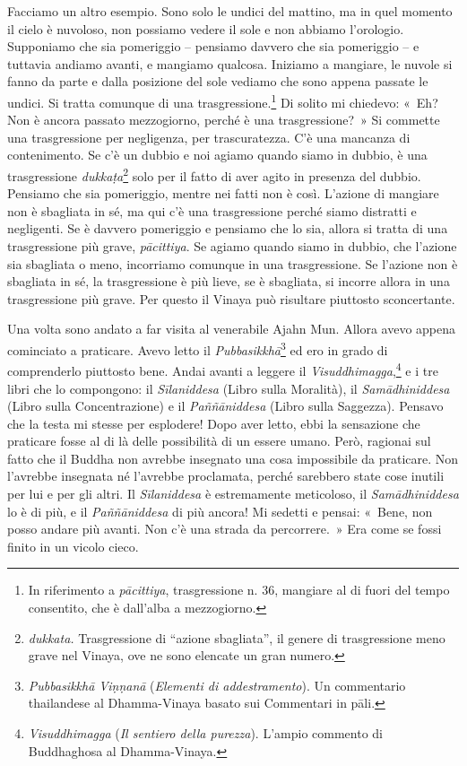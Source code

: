 Facciamo un altro esempio. Sono solo le undici del mattino, ma in quel
momento il cielo è nuvoloso, non possiamo vedere il sole e non abbiamo
l'orologio. Supponiamo che sia pomeriggio -- pensiamo davvero che sia
pomeriggio -- e tuttavia andiamo avanti, e mangiamo qualcosa. Iniziamo a
mangiare, le nuvole si fanno da parte e dalla posizione del sole vediamo
che sono appena passate le undici. Si tratta comunque di una
trasgressione.\footnote{In riferimento a \emph{pācittiya}, trasgressione
  n. 36, mangiare al di fuori del tempo consentito, che è dall'alba a
  mezzogiorno.} Di solito mi chiedevo: «~Eh? Non è ancora passato
mezzogiorno, perché è una trasgressione?~» Si commette una trasgressione
per negligenza, per trascuratezza. C'è una mancanza di contenimento. Se
c'è un dubbio e noi agiamo quando siamo in dubbio, è una trasgressione
\emph{dukkaṭa}\footnote{\emph{dukkata.} Trasgressione di ``azione
  sbagliata'', il genere di trasgressione meno grave nel Vinaya, ove ne
  sono elencate un gran numero.} solo per il fatto di aver agito in
presenza del dubbio. Pensiamo che sia pomeriggio, mentre nei fatti non è
così. L'azione di mangiare non è sbagliata in sé, ma qui c'è una
trasgressione perché siamo distratti e negligenti. Se è davvero
pomeriggio e pensiamo che lo sia, allora si tratta di una trasgressione
più grave, \emph{pācittiya}. Se agiamo quando siamo in dubbio, che
l'azione sia sbagliata o meno, incorriamo comunque in una trasgressione.
Se l'azione non è sbagliata in sé, la trasgressione è più lieve, se è
sbagliata, si incorre allora in una trasgressione più grave. Per questo
il Vinaya può risultare piuttosto sconcertante.

Una volta sono andato a far visita al venerabile Ajahn Mun. Allora avevo
appena cominciato a praticare. Avevo letto il
\emph{Pubbasikkhā}\footnote{\emph{Pubbasikkhā Viṇṇanā} (\emph{Elementi
  di addestramento}). Un commentario thailandese al Dhamma-Vinaya basato
  sui Commentari in pāli.} ed ero in grado di comprenderlo piuttosto
bene. Andai avanti a leggere il \emph{Visuddhimagga},\footnote{\emph{Visuddhimagga}
  (\emph{Il sentiero della purezza}). L'ampio commento di Buddhaghosa al
  Dhamma-Vinaya.} e i tre libri che lo compongono: il \emph{Sīlaniddesa}
(Libro sulla Moralità), il \emph{Samādhiniddesa} (Libro sulla
Concentrazione) e il \emph{Paññāniddesa} (Libro sulla Saggezza). Pensavo
che la testa mi stesse per esplodere! Dopo aver letto, ebbi la
sensazione che praticare fosse al di là delle possibilità di un essere
umano. Però, ragionai sul fatto che il Buddha non avrebbe insegnato una
cosa impossibile da praticare. Non l'avrebbe insegnata né l'avrebbe
proclamata, perché sarebbero state cose inutili per lui e per gli altri.
Il \emph{Sīlaniddesa} è estremamente meticoloso, il
\emph{Samādhiniddesa} lo è di più, e il \emph{Paññāniddesa} di più
ancora! Mi sedetti e pensai: «~Bene, non posso andare più avanti. Non
c'è una strada da percorrere.~» Era come se fossi finito in un vicolo
cieco.


